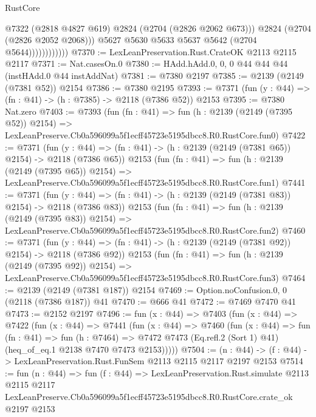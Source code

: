 \begin{lexlean}{RustCore}
\begin{coremodule}
                              @7322
                              (@2818 @4827 @619)
                              @2824
                              (@2704 (@2826 @2062 @673)))
                            @2824
                            (@2704 (@2826 @2052 @2068)))
                          @5627
                          @5630
                          @5633
                          @5637
                          @5642
                          (@2704 @5644))))))))))))
@7370 := LexLeanPreservation.Rust.CrateOK @2113 @2115 @2117
@7371 := Nat.casesOn.{0}
@7380 := HAdd.hAdd.{0, 0, 0} @44 @44 @44 (instHAdd.{0} @44 instAddNat)
@7381 := @7380 @2197
@7385 := @2139 (@2149 (@7381 @52)) @2154
@7386 := @7380 @2195
@7393 := @7371 (fun (y : @44) => (fn : @41) -> (h : @7385) -> @2118 (@7386 @52)) @2153
@7395 := @7380 Nat.zero
@7403 := @7393
    (fun (fn : @41) =>
    fun (h : @2139 (@2149 (@7395 @52)) @2154) =>
    LexLeanPreserve.Cb0a596099a5f1ecff45723e5195dbcc8.R0.RustCore.fun0)
@7422 := @7371
    (fun (y : @44) => (fn : @41) -> (h : @2139 (@2149 (@7381 @65)) @2154) -> @2118 (@7386 @65))
    @2153
    (fun (fn : @41) =>
    fun (h : @2139 (@2149 (@7395 @65)) @2154) =>
    LexLeanPreserve.Cb0a596099a5f1ecff45723e5195dbcc8.R0.RustCore.fun1)
@7441 := @7371
    (fun (y : @44) => (fn : @41) -> (h : @2139 (@2149 (@7381 @83)) @2154) -> @2118 (@7386 @83))
    @2153
    (fun (fn : @41) =>
    fun (h : @2139 (@2149 (@7395 @83)) @2154) =>
    LexLeanPreserve.Cb0a596099a5f1ecff45723e5195dbcc8.R0.RustCore.fun2)
@7460 := @7371
    (fun (y : @44) => (fn : @41) -> (h : @2139 (@2149 (@7381 @92)) @2154) -> @2118 (@7386 @92))
    @2153
    (fun (fn : @41) =>
    fun (h : @2139 (@2149 (@7395 @92)) @2154) =>
    LexLeanPreserve.Cb0a596099a5f1ecff45723e5195dbcc8.R0.RustCore.fun3)
@7464 := @2139 (@2149 (@7381 @187)) @2154
@7469 := Option.noConfusion.{0, 0} (@2118 (@7386 @187)) @41
@7470 := @666 @41
@7472 := @7469 @7470 @41
@7473 := @2152 @2197
@7496 := fun (x : @44) =>
  @7403
    (fun (x : @44) =>
    @7422
      (fun (x : @44) =>
      @7441
        (fun (x : @44) =>
        @7460
          (fun (x : @44) =>
          fun (fn : @41) =>
          fun (h : @7464) =>
          @7472 @7473 (Eq.refl.{2} (Sort 1) @41) (heq_of_eq.{1} @2138 @7470 @7473 @2153)))))
@7504 := (n : @44) -> (f : @44) -> LexLeanPreservation.Rust.FunSem @2113 @2115 @2117 @2197 @2153
@7514 := fun (n : @44) =>
  fun (f : @44) =>
  LexLeanPreservation.Rust.simulate
    @2113
    @2115
    @2117
    LexLeanPreserve.Cb0a596099a5f1ecff45723e5195dbcc8.R0.RustCore.crate_ok
    @2197
    @2153
\end{coremodule}
\end{lexlean}
